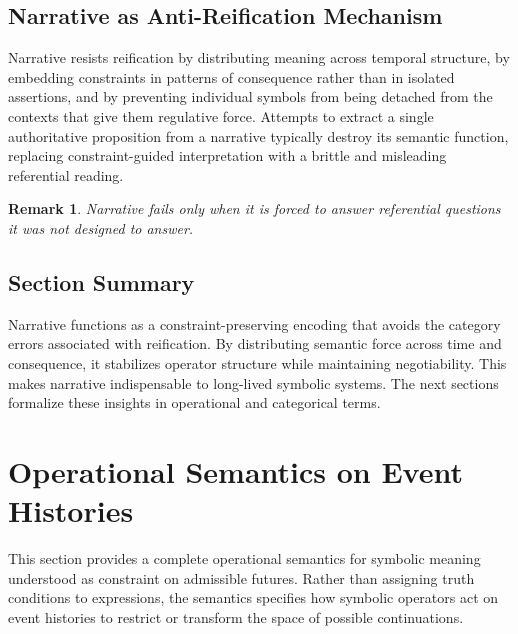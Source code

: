\documentclass[11pt]{article}
\newtheorem{remark}{Remark}
\begin{document}
\subsection{Narrative as Anti-Reification Mechanism}

Narrative resists reification by distributing meaning across temporal structure,
by embedding constraints in patterns of consequence rather than in isolated
assertions, and by preventing individual symbols from being detached from the
contexts that give them regulative force. Attempts to extract a single
authoritative proposition from a narrative typically destroy its semantic
function, replacing constraint-guided interpretation with a brittle and
misleading referential reading.

\begin{remark}
Narrative fails only when it is forced to answer referential questions it was not
designed to answer.
\end{remark}

\subsection{Section Summary}

Narrative functions as a constraint-preserving encoding that avoids the category
errors associated with reification. By distributing semantic force across time
and consequence, it stabilizes operator structure while maintaining
negotiability. This makes narrative indispensable to long-lived symbolic systems.
The next sections formalize these insights in operational and categorical terms.

\section{Operational Semantics on Event Histories}

This section provides a complete operational semantics for symbolic meaning
understood as constraint on admissible futures. Rather than assigning truth
conditions to expressions, the semantics specifies how symbolic operators act on
event histories to restrict or transform the space of possible continuations.
\end{document}
